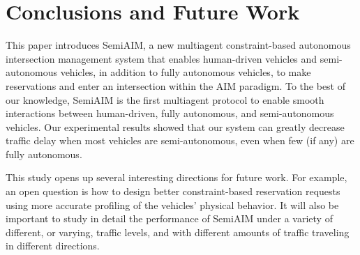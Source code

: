 \section{Conclusions and Future Work}
\label{sec:conclusions}

This paper introduces SemiAIM, a new multiagent constraint-based
autonomous intersection management system that enables human-driven
vehicles and semi-autonomous vehicles, in addition to fully autonomous
vehicles, to make reservations and enter an intersection within the
AIM paradigm.  To the best of our knowledge, SemiAIM is the first
multiagent protocol to enable smooth interactions between
human-driven, fully autonomous, and semi-autonomous vehicles.  Our
experimental results showed that our system can greatly decrease
traffic delay when most vehicles are semi-autonomous, even when few
(if any) are fully autonomous.

This study opens up several interesting directions for future work.
For example, an open question is how to design better constraint-based
reservation requests using more accurate profiling of the vehicles'
physical behavior.  It will also be important to study in detail the
performance of SemiAIM under a variety of different, or varying,
traffic levels, and with different amounts of traffic traveling in
different directions.










